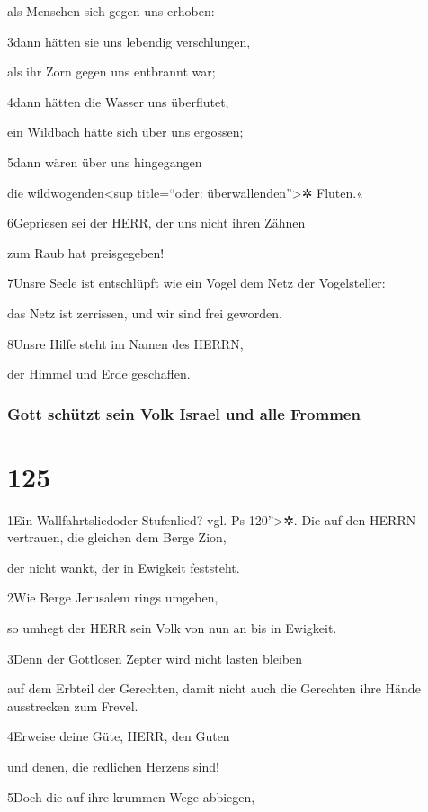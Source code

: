 als Menschen sich gegen uns erhoben:

3dann hätten sie uns lebendig verschlungen,

als ihr Zorn gegen uns entbrannt war;

4dann hätten die Wasser uns überflutet,

ein Wildbach hätte sich über uns ergossen;

5dann wären über uns hingegangen

die wildwogenden\textless sup title=``oder: überwallenden''\textgreater✲
Fluten.«

6Gepriesen sei der HERR, der uns nicht ihren Zähnen

zum Raub hat preisgegeben!

7Unsre Seele ist entschlüpft wie ein Vogel dem Netz der Vogelsteller:

das Netz ist zerrissen, und wir sind frei geworden.

8Unsre Hilfe steht im Namen des HERRN,

der Himmel und Erde geschaffen.

\hypertarget{gott-schuxfctzt-sein-volk-israel-und-alle-frommen}{%
\subsubsection{Gott schützt sein Volk Israel und alle
Frommen}\label{gott-schuxfctzt-sein-volk-israel-und-alle-frommen}}

\hypertarget{section-124}{%
\section{125}\label{section-124}}

1Ein Wallfahrtsliedoder Stufenlied? vgl. Ps 120''\textgreater✲. Die auf
den HERRN vertrauen, die gleichen dem Berge Zion,

der nicht wankt, der in Ewigkeit feststeht.

2Wie Berge Jerusalem rings umgeben,

so umhegt der HERR sein Volk von nun an bis in Ewigkeit.

3Denn der Gottlosen Zepter wird nicht lasten bleiben

auf dem Erbteil der Gerechten, damit nicht auch die Gerechten ihre Hände
ausstrecken zum Frevel.

4Erweise deine Güte, HERR, den Guten

und denen, die redlichen Herzens sind!

5Doch die auf ihre krummen Wege abbiegen,

